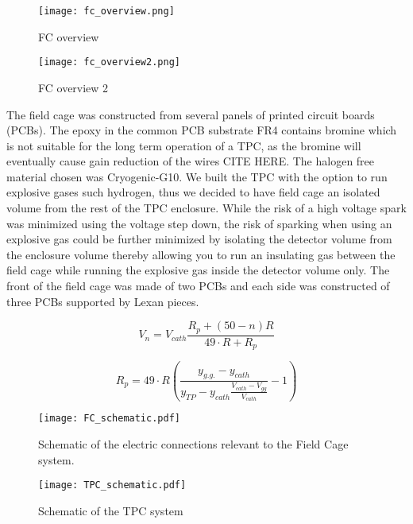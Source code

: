 \begin{figure}[!htb]
\texttt{[image: fc\_overview.png]}
\label{fig:fc_overview}
\caption{FC overview}
\end{figure}


\begin{figure}[!htb]
\texttt{[image: fc\_overview2.png]}
\label{fig:fc_overview2}
\caption{FC overview 2}
\end{figure}

The field cage was constructed from several panels of printed circuit boards (PCBs). The epoxy in the common PCB substrate FR4 contains bromine which is not suitable for the long term operation of a TPC, as the bromine will eventually cause gain reduction of the wires CITE HERE. The halogen free material chosen was Cryogenic-G10. We built the TPC with the option to run explosive gases such hydrogen, thus we decided to have field cage an isolated volume from the rest of the TPC enclosure. While the risk of a high voltage spark was minimized using the voltage step down, the risk of sparking when using an explosive gas could be further minimized by isolating the detector volume from the enclosure volume thereby allowing you to run an insulating gas between the field cage while running the explosive gas inside the detector volume only. The front of the field cage was made of two PCBs and each side was constructed of three PCBs supported by Lexan pieces. 

\begin{equation}
V_n = V_{cath} \frac{R_p + (50 - n)R}{49\cdot R + R_p}
\label{eq:FCstrip}
\end{equation}

\begin{equation}
R_p = 49 \cdot R  \left(\frac{ y_{g.g.} - y_{cath} }{ y_{TP} - y_{cath} \frac{V_{cath} - V_{gg}}{V_{cath}} }- 1 \right)
\label{eq:TP_resistor}
\end{equation}

\begin{figure}[!htb]
\centering
\texttt{[image: FC\_schematic.pdf]}
\caption{Schematic of the electric connections relevant to the Field Cage system.}
\label{fig:FC_schematic}
\end{figure}


\begin{figure}[!htb]
\centering
\texttt{[image: TPC\_schematic.pdf]}
\caption{Schematic of the TPC system}
\label{fig:TPC_schematic}
\end{figure}

